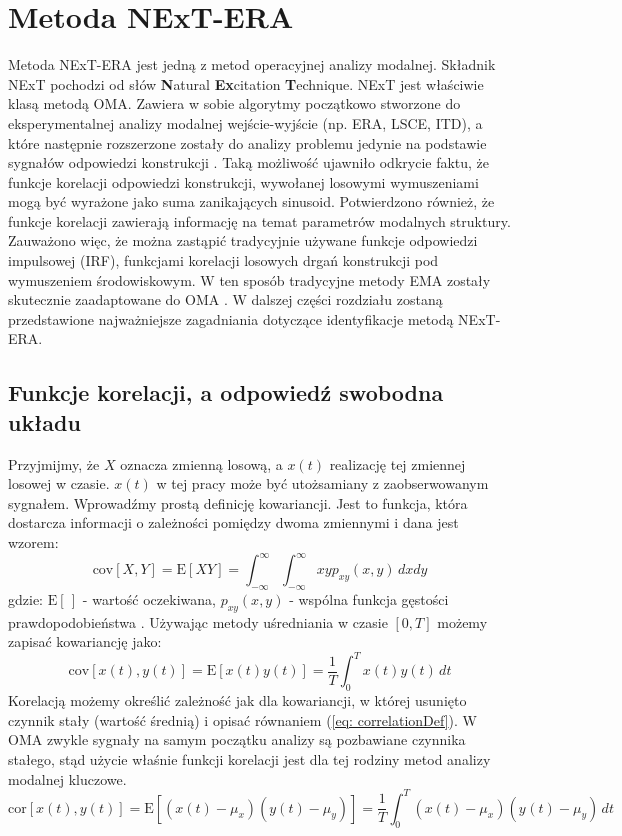 \section{Metoda NExT-ERA}
Metoda NExT-ERA jest jedną z metod operacyjnej analizy modalnej. Składnik NExT pochodzi od słów \textbf{N}atural \textbf{Ex}citation \textbf{T}echnique. NExT jest właściwie klasą metodą OMA. Zawiera w sobie algorytmy początkowo stworzone do eksperymentalnej analizy modalnej wejście-wyjście  (np. ERA, LSCE, ITD), a które następnie rozszerzone zostały do analizy problemu jedynie na podstawie sygnałów odpowiedzi konstrukcji . Taką możliwość ujawniło odkrycie faktu, że funkcje korelacji odpowiedzi konstrukcji, wywołanej losowymi wymuszeniami mogą być wyrażone jako suma zanikających sinusoid. Potwierdzono również, że funkcje korelacji zawierają informację na temat parametrów modalnych struktury. Zauważono więc, że można zastąpić tradycyjnie używane funkcje odpowiedzi impulsowej (IRF), funkcjami korelacji losowych drgań konstrukcji pod wymuszeniem środowiskowym. W ten sposób tradycyjne metody EMA zostały skutecznie zaadaptowane do OMA \parencite{Rainieri2014}. W dalszej części rozdziału zostaną przedstawione najważniejsze zagadniania dotyczące identyfikacje metodą NExT-ERA. 

\subsection{Funkcje korelacji, a odpowiedź swobodna układu}
Przyjmijmy, że $X$ oznacza zmienną losową, a $x(t)$ realizację tej zmiennej losowej w czasie. $x(t)$ w tej pracy może być utożsamiany z zaobserwowanym sygnałem. Wprowadźmy prostą definicję kowariancji. Jest to funkcja, która dostarcza informacji o zależności pomiędzy dwoma zmiennymi i dana jest wzorem:
\begin{equation}
	\mathrm{cov}[X,Y] = \mathrm{E}[XY]=\int_{-\infty}^{\infty}\int_{-\infty}^{\infty}xyp_{xy}(x,y)\,dxdy
\end{equation}
gdzie: $\mathrm{E}[\,]$ - wartość oczekiwana, $p_{xy}(x,y)$ - wspólna funkcja gęstości prawdopodobieństwa . Używając metody uśredniania w czasie $[0,T]$ możemy zapisać kowariancję jako:
\begin{equation}
	\mathrm{cov}[x(t),y(t)] = \mathrm{E}[x(t)y(t)]=\frac{1}{T}\int_{0}^{T}x(t)y(t) \,dt
\end{equation}
Korelacją możemy określić zależność jak dla kowariancji, w której usunięto czynnik stały (wartość średnią) i opisać równaniem (\ref{eq: correlationDef}). W OMA zwykle sygnały na samym początku analizy są pozbawiane czynnika stałego, stąd użycie właśnie funkcji korelacji jest dla tej rodziny metod analizy modalnej kluczowe.
\begin{equation} \label{eq: correlationDef}
	\mathrm{cor}[x(t),y(t)] = \mathrm{E}[(x(t)-\mu_x)(y(t)-\mu_y)]=\frac{1}{T}\int_{0}^{T}(x(t)-\mu_x)(y_{}(t)-\mu_y) \,dt
\end{equation}

